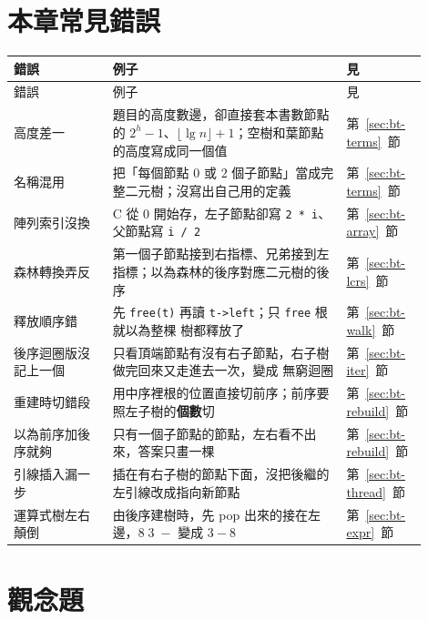 \section{本章常見錯誤}
\label{sec:bt-pitfalls}

\begingroup\setlength{\LTpre}{\smallskipamount}\setlength{\LTpost}{\medskipamount}
\begin{longtable}{>{\raggedright\arraybackslash}p{0.22\linewidth}>{\raggedright\arraybackslash}p{0.52\linewidth}>{\raggedright\arraybackslash}p{0.16\linewidth}}
\toprule
錯誤 & 例子 & 見 \\
\midrule
\endfirsthead
\toprule
錯誤 & 例子 & 見 \\
\midrule
\endhead
高度差一 & 題目的高度數邊，卻直接套本書數節點的 $2^h - 1$、$\lfloor \lg n \rfloor
+ 1$；空樹和葉節點的高度寫成同一個值 &
第~\ref{sec:bt-terms}~節 \\
名稱混用 & 把「每個節點 $0$ 或 $2$ 個子節點」當成完整二元樹；沒寫出自己用的定義 &
第~\ref{sec:bt-terms}~節 \\
陣列索引沒換 & C 從 $0$ 開始存，左子節點卻寫 \texttt{2 * i}、父節點寫 \texttt{i / 2} &
第~\ref{sec:bt-array}~節 \\
森林轉換弄反 & 第一個子節點接到右指標、兄弟接到左指標；以為森林的後序對應二元樹的後序 &
第~\ref{sec:bt-lcrs}~節 \\
釋放順序錯 & 先 \texttt{free(t)} 再讀 \texttt{t->left}；只 \texttt{free} 根就以為整棵
樹都釋放了 & 第~\ref{sec:bt-walk}~節 \\
後序迴圈版沒記上一個 & 只看頂端節點有沒有右子節點，右子樹做完回來又走進去一次，變成
無窮迴圈 & 第~\ref{sec:bt-iter}~節 \\
重建時切錯段 & 用中序裡根的位置直接切前序；前序要照左子樹的\textbf{個數}切 &
第~\ref{sec:bt-rebuild}~節 \\
以為前序加後序就夠 & 只有一個子節點的節點，左右看不出來，答案只畫一棵 &
第~\ref{sec:bt-rebuild}~節 \\
引線插入漏一步 & 插在有右子樹的節點下面，沒把後繼的左引線改成指向新節點 &
第~\ref{sec:bt-thread}~節 \\
運算式樹左右顛倒 & 由後序建樹時，先 pop 出來的接在左邊，$8\;3\;-$ 變成 $3 - 8$ &
第~\ref{sec:bt-expr}~節 \\
\bottomrule
\end{longtable}
\endgroup

\section{觀念題}
\label{sec:bt-exercises}

